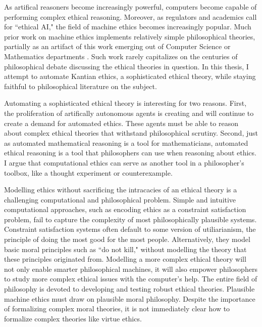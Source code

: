 %
\begin{isabellebody}%
%
%
\isadelimtheory
%
\endisadelimtheory
%
\isatagtheory
%
\endisatagtheory
{\isafoldtheory}%
%
\isadelimtheory
%
\endisadelimtheory
%
\isadelimdocument
%
\endisadelimdocument
%
\isatagdocument
%
\isamarkuptrue%
%
\endisatagdocument
{\isafolddocument}%
%
\isadelimdocument
%
\endisadelimdocument
%
\begin{isamarkuptext}%
As artifical reasoners become increasingly powerful, computers become capable of
performing complex ethical reasoning. Moreover, as regulators and academics call for ``ethical AI,"
the field of machine ethics becomes increasingly popular. Much prior work on machine ethics implements
relatively simple philosophical theories, partially as an artifact of this work emerging out of
Computer Science or Mathematics departments \citep{mesurvey}. Such work rarely capitalizes on the 
centuries of philosophical debate discussing the ethical theories in question. In this thesis, I attempt
to automate Kantian ethics, a sophisticated ethical theory, while staying faithful to philosophical
literature on the subject.

Automating a sophisticated ethical theory is interesting for two reasons. First, the proliferation of 
artifically autonomous agents is creating and will continue to create a demand for 
automated ethics. These agents must be able to reason about complex ethical theories 
that withstand philosophical scrutiny. Second, just as automated mathematical reasoning is a tool
for mathematicians, automated ethical reasoning is a tool that philosophers can use 
when reasoning about ethics. I argue that computational ethics can serve as another tool in a 
philosopher's toolbox, like a thought experiment or counterexample.

Modelling ethics without sacrificing the intracacies of an ethical theory is a 
challenging computational and philosophical problem. Simple and intuitive computational approaches, 
such as encoding ethics as a constraint satisfaction problem, fail to capture
the complexity of most philosophically plausible systems. Constraint satisfaction systems often default to some version of utiliarianism, 
the principle of doing the most good for the most people. Alternatively, they model basic moral 
principles such as ``do not kill," without modelling the theory that these principles originated from.
Modelling a more complex ethical theory will not only enable smarter philosophical machines, it will
also empower philosophers to study more complex ethical issues with the computer's help. The entire
field of philosophy is devoted to developing and testing robust ethical theories. Plausible machine
ethics must draw on plausible moral philosophy. Despite the importance of formalizing complex moral theories,
it is not immediately clear how to formalize complex theories like virtue ethics.


\end{isamarkuptext}
\end{isabellebody}
